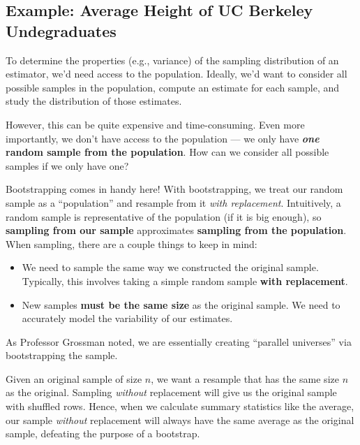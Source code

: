 \documentclass[
  letterpaper,
  DIV=11,
  numbers=noendperiod]{scrreprt}
\providecommand{\tightlist}{%
  \setlength{\itemsep}{0pt}\setlength{\parskip}{0pt}}\usepackage{longtable,booktabs,array}
\begin{document}
\subsection{Example: Average Height of UC Berkeley
Undegraduates}\label{example-average-height-of-uc-berkeley-undegraduates}

To determine the properties (e.g., variance) of the sampling
distribution of an estimator, we'd need access to the population.
Ideally, we'd want to consider all possible samples in the population,
compute an estimate for each sample, and study the distribution of those
estimates.

However, this can be quite expensive and time-consuming. Even more
importantly, we don't have access to the population --- we only have
\textbf{\emph{one} random sample from the population}. How can we
consider all possible samples if we only have one?

Bootstrapping comes in handy here! With bootstrapping, we treat our
random sample as a ``population'' and resample from it \emph{with
replacement}. Intuitively, a random sample is representative of the
population (if it is big enough), so \textbf{sampling from our sample}
approximates \textbf{sampling from the population}. When sampling, there
are a couple things to keep in mind:

\begin{itemize}
\tightlist
\item
  We need to sample the same way we constructed the original sample.
  Typically, this involves taking a simple random sample \textbf{with
  replacement}.
\item
  New samples \textbf{must be the same size} as the original sample. We
  need to accurately model the variability of our estimates.
\end{itemize}

As Professor Grossman noted, we are essentially creating ``parallel
universes'' via bootstrapping the sample.

\begin{tcolorbox}[enhanced jigsaw, arc=.35mm, left=2mm, toprule=.15mm, leftrule=.75mm, bottomrule=.15mm, colframe=quarto-callout-caution-color-frame, rightrule=.15mm, colbacktitle=quarto-callout-caution-color!10!white, opacitybacktitle=0.6, coltitle=black, bottomtitle=1mm, colback=white, toptitle=1mm, title=\textcolor{quarto-callout-caution-color}{\faFire}\hspace{0.5em}{Why must we resample \emph{with replacement}?}, breakable, opacityback=0, titlerule=0mm]

Given an original sample of size \(n\), we want a resample that has the
same size \(n\) as the original. Sampling \emph{without} replacement
will give us the original sample with shuffled rows. Hence, when we
calculate summary statistics like the average, our sample \emph{without}
replacement will always have the same average as the original sample,
defeating the purpose of a bootstrap.

\end{tcolorbox}
\end{document}
